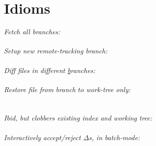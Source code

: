 \section{Idioms}

\textit{Fetch all branches:}\\
 \\[1mm]
\textit{Setup new remote-tracking branch:}\\
 \\[1mm]
\textit{Diff files in different \ul{b}ranches:} \\
 \\[1mm]
\textit{Restore file from branch $to$ work-tree only:} \\
 \\
 \\[1mm]
\textit{Ibid, but clobbers existing index and working tree:} \\
 \\[1mm]
\textit{Interactively accept/reject $\Delta$s, in batch-mode:} \\
 \\[1mm]
